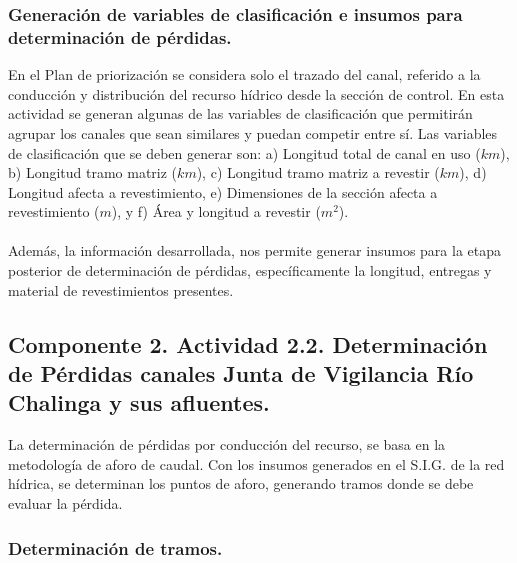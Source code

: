 \documentclass[]{article}
\begin{document}
\subsubsection{Generación de variables de clasificación e insumos para determinación de pérdidas.}

En el Plan de priorización se considera solo el trazado del canal, referido a la conducción y distribución del recurso hídrico desde la sección de control. En esta actividad se generan algunas de las variables de clasificación que permitirán agrupar los canales que sean similares y puedan competir entre sí. Las variables de clasificación que se deben generar son: a) Longitud total de canal en uso ($km$), b) Longitud tramo matriz ($km$), c) Longitud tramo matriz a revestir ($km$), d) Longitud afecta a revestimiento, e) Dimensiones de la sección afecta a revestimiento ($m$), y f) Área y longitud a revestir ($m^2$). \\
\\
Además, la información desarrollada, nos permite generar insumos para la etapa posterior de determinación de pérdidas, específicamente la longitud, entregas y material de revestimientos presentes.
\clearpage
\subsection{Componente 2. Actividad 2.2. Determinación de Pérdidas canales Junta de Vigilancia Río Chalinga y sus afluentes.}

La determinación de pérdidas por conducción del recurso, se basa en la metodología de aforo de caudal. Con los insumos generados en el S.I.G. de la red hídrica, se determinan los puntos de aforo, generando tramos donde se debe evaluar la pérdida. 

\subsubsection{Determinación de tramos.}
\end{document}
